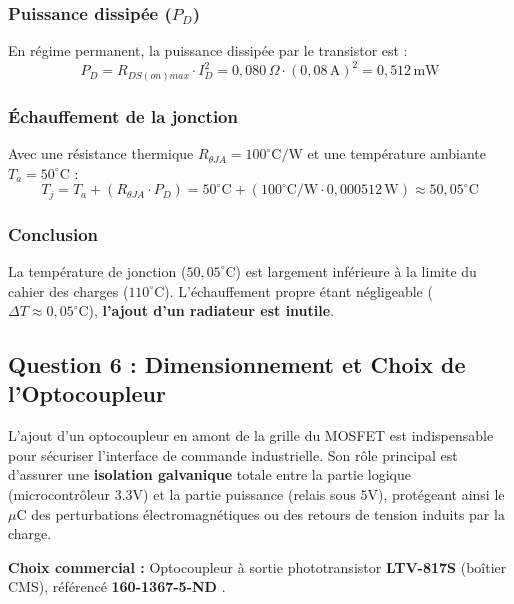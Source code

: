 \documentclass[11pt,a4paper]{article}
\begin{document}
\subsubsection{Puissance dissipée ($P_D$)}
En régime permanent, la puissance dissipée par le transistor est :
\begin{equation}
    P_D = R_{DS(on)max} \cdot I_D^2 = 0{,}080\,\Omega \cdot (0{,}08\,\text{A})^2 = 0{,}512\,\text{mW}
\end{equation}

\subsubsection{Échauffement de la jonction}
Avec une résistance thermique $R_{\theta JA} = 100^\circ\text{C/W}$ et une température ambiante $T_a = 50^\circ\text{C}$ :
\begin{equation}
    T_j = T_a + (R_{\theta JA} \cdot P_D) = 50^\circ\text{C} + (100^\circ\text{C/W} \cdot 0{,}000512\,\text{W}) \approx 50{,}05^\circ\text{C}
\end{equation}

\subsubsection{Conclusion}
La température de jonction ($50{,}05^\circ\text{C}$) est largement inférieure à la limite du cahier des charges ($110^\circ\text{C}$). L'échauffement propre étant négligeable ($\Delta T \approx 0{,}05^\circ\text{C}$), \textbf{l'ajout d'un radiateur est inutile}.


\subsection{Question 6 : Dimensionnement et Choix de l'Optocoupleur}

L'ajout d'un optocoupleur en amont de la grille du MOSFET est indispensable pour sécuriser l'interface de commande industrielle. Son rôle principal est d'assurer une \textbf{isolation galvanique} totale entre la partie logique (microcontrôleur $3.3\text{V}$) et la partie puissance (relais sous $5\text{V}$), protégeant ainsi le $\mu$C des perturbations électromagnétiques ou des retours de tension induits par la charge.

\textbf{Choix commercial :} Optocoupleur à sortie phototransistor \textbf{LTV-817S} (boîtier CMS), référencé \textbf{160-1367-5-ND} \cite{liteon_opto}.
\end{document}
